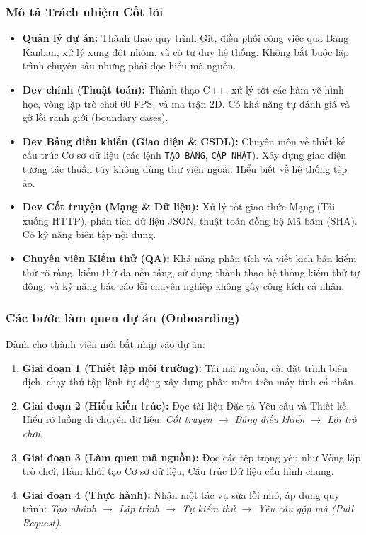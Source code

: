 \documentclass[12pt,a4paper]{article}
\begin{document}
\subsubsection{Mô tả Trách nhiệm Cốt lõi}
\begin{itemize}[leftmargin=*]
    \item \textbf{Quản lý dự án:} Thành thạo quy trình Git, điều phối công việc qua Bảng Kanban, xử lý xung đột nhóm, và có tư duy hệ thống. Không bắt buộc lập trình chuyên sâu nhưng phải đọc hiểu mã nguồn.
    \item \textbf{Dev chính (Thuật toán):} Thành thạo C++, xử lý tốt các hàm vẽ hình học, vòng lặp trò chơi 60 FPS, và ma trận 2D. Có khả năng tự đánh giá và gỡ lỗi ranh giới (boundary cases).
    \item \textbf{Dev Bảng điều khiển (Giao diện \& CSDL):} Chuyên môn về thiết kế cấu trúc Cơ sở dữ liệu (các lệnh \texttt{TẠO BẢNG}, \texttt{CẬP NHẬT}). Xây dựng giao diện tương tác thuần túy không dùng thư viện ngoài. Hiểu biết về hệ thống tệp ảo.
    \item \textbf{Dev Cốt truyện (Mạng \& Dữ liệu):} Xử lý tốt giao thức Mạng (Tải xuống HTTP), phân tích dữ liệu JSON, thuật toán đồng bộ Mã băm (SHA). Có kỹ năng biên tập nội dung.
    \item \textbf{Chuyên viên Kiểm thử (QA):} Khả năng phân tích và viết kịch bản kiểm thử rõ ràng, kiểm thử đa nền tảng, sử dụng thành thạo hệ thống kiểm thử tự động, và kỹ năng báo cáo lỗi chuyên nghiệp không gây công kích cá nhân.
\end{itemize}

\subsubsection{Các bước làm quen dự án (Onboarding)}
Dành cho thành viên mới bắt nhịp vào dự án:
\begin{enumerate}[nosep]
    \item \textbf{Giai đoạn 1 (Thiết lập môi trường):} Tải mã nguồn, cài đặt trình biên dịch, chạy thử tập lệnh tự động xây dựng phần mềm trên máy tính cá nhân.
    \item \textbf{Giai đoạn 2 (Hiểu kiến trúc):} Đọc tài liệu Đặc tả Yêu cầu và Thiết kế. Hiểu rõ luồng di chuyển dữ liệu: \textit{Cốt truyện $\rightarrow$ Bảng điều khiển $\rightarrow$ Lõi trò chơi}.
    \item \textbf{Giai đoạn 3 (Làm quen mã nguồn):} Đọc các tệp trọng yếu như Vòng lặp trò chơi, Hàm khởi tạo Cơ sở dữ liệu, Cấu trúc Dữ liệu cấu hình chung.
    \item \textbf{Giai đoạn 4 (Thực hành):} Nhận một tác vụ sửa lỗi nhỏ, áp dụng quy trình: \textit{Tạo nhánh $\rightarrow$ Lập trình $\rightarrow$ Tự kiểm thử $\rightarrow$ Yêu cầu gộp mã (Pull Request)}.
\end{enumerate}
\end{document}
